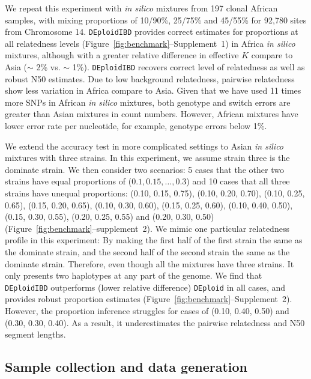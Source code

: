 \documentclass[9pt,lineno]{elife}
\begin{document}
We repeat this experiment with {\it in silico} mixtures from 197 clonal African samples, with mixing proportions of 10/90\%, 25/75\% and 45/55\% for 92,780 sites from Chromosome 14. \texttt{DEploidIBD} provides correct estimates for proportions at all relatedness levels (Figure~\ref{fig:benchmark}--Supplement~1) in Africa {\it in silico} mixtures, although with a greater relative difference in effective $K$ compare to Asia ($\sim$ 2\% vs. $\sim$ 1\%). \texttt{DEploidIBD} recovers correct level of relatedness as well as robust N50 estimates. Due to low background relatedness, pairwise relatedness show less variation in Africa compare to Asia. Given that we have used 11 times more SNPs in African {\it in silico} mixtures, both genotype and switch errors are greater than Asian mixtures in count numbers. However, African mixtures have lower error rate per nucleotide, for example, genotype errors below 1\%.

We extend the accuracy test in more complicated settings to Asian {\it in silico} mixtures with three strains. In this experiment, we assume strain three is the dominate strain. We then consider two scenarios: 5 cases that the other two strains have equal proportions of ($0.1, 0.15, \dots, 0.3$) and 10 cases that all three strains have unequal proportions: (0.10, 0.15, 0.75), (0.10, 0.20, 0.70), (0.10, 0.25, 0.65), (0.15, 0.20, 0.65), (0.10, 0.30, 0.60), (0.15, 0.25, 0.60), (0.10, 0.40, 0.50), (0.15, 0.30, 0.55), (0.20, 0.25, 0.55) and (0.20, 0.30, 0.50) (Figure~\ref{fig:benchmark}--supplement~2). We mimic one particular relatedness profile in this experiment: By making the first half of the first strain the same as the dominate strain, and the second half of the second strain the same as the dominate strain. Therefore, even though all the mixtures have three strains. It only presents two haplotypes at any part of the genome. We find that \texttt{DEploidIBD} outperforms (lower relative difference) \texttt{DEploid} in all cases, and provides robust proportion estimates (Figure~\ref{fig:benchmark}--Supplement~2). However, the proportion inference struggles for cases of (0.10, 0.40, 0.50) and (0.30, 0.30, 0.40). As a result, it underestimates the pairwise relatedness and N50 segment lengths.




\subsection{Sample collection and data generation}
\end{document}
